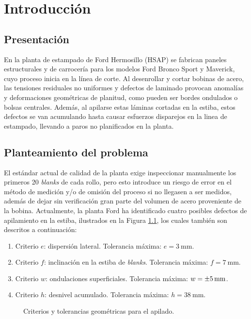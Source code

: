 \chapter{Introducción}

\section{Presentación}
En la planta de estampado de Ford Hermosillo (HSAP) se fabrican paneles estructurales y de carrocería para los modelos Ford Bronco Sport y Maverick, cuyo proceso inicia en la línea de corte.
Al desenrollar y cortar bobinas de acero, las tensiones residuales no uniformes y defectos de laminado provocan anomalías y deformaciones geométricas de planitud, como pueden ser bordes ondulados o bolsas centrales.
Además, al apilarse estas láminas cortadas en la estiba, estos defectos se van acumulando hasta causar esfuerzos disparejos en la linea de estampado, llevando a paros no planificados en la planta.

\section{Planteamiento del problema}

El estándar actual de calidad de la planta exige inspeccionar manualmente los primeros 20 \textit{blanks} de cada rollo, pero esto introduce un riesgo de error en el método de medición y/o de omisión del proceso si no llegasen a ser medidos, además de dejar sin verificación gran parte del volumen de acero proveniente de la bobina.
Actualmente, la planta Ford ha identificado cuatro posibles defectos de apilamiento en la estiba, ilustrados en la Figura \ref{fig:criterios_apilado}, los cuales también son descritos a continuación:

\begin{enumerate}
	\item Criterio \(e\): dispersión lateral. Tolerancia máxima: \(e = \qty{3}{\mm}\).
	\item Criterio \(f\): inclinación en la estiba de \textit{blanks}. Tolerancia máxima: \(f = \qty{7}{\mm}\).
	\item Criterio \(w\): ondulaciones superficiales. Tolerancia máxima: \(w = \qty{\pm 5}{\mm}\).
	\item Criterio \(h\): desnivel acumulado. Tolerancia máxima: \(h = \qty{38}{\mm}\).
\end{enumerate}

\begin{figure}
	\centering
	
	\caption{Criterios y tolerancias geométricas para el apilado.}
	\label{fig:criterios_apilado}
\end{figure}



